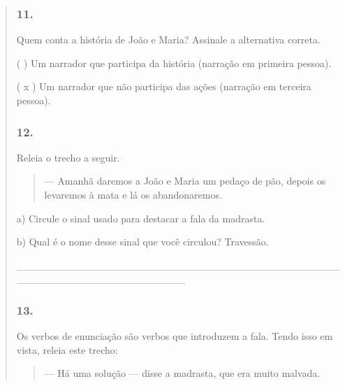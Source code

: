 \begin{quote}
\subsubsection{11. }\label{section-26}

Quem conta a história de João e Maria? Assinale a alternativa correta.


( ) Um narrador que participa da história (narração em primeira pessoa).

( x ) Um narrador que não participa das ações (narração em terceira
pessoa).

\subsubsection{12. }\label{section-27}

Releia o trecho a seguir.

\begin{quote}
--- Amanhã daremos a João e Maria um pedaço de pão, depois os
levaremos à mata e lá os abandonaremos.
\end{quote}

a) Circule o sinal usado para destacar a fala da madrasta.

b) Qual é o nome desse sinal que você circulou? Travessão.

\_\_\_\_\_\_\_\_\_\_\_\_\_\_\_\_\_\_\_\_\_\_\_\_\_\_\_\_\_\_\_\_\_\_\_\_\_\_\_\_\_\_\_\_\_\_\_\_\_\_\_\_\_\_\_\_\_\_\_\_\_\_\_\_\_\_\_

\subsubsection{13. }\label{section-28}

Os verbos de enunciação são verbos que introduzem a fala. Tendo isso em
vista, releia este trecho:

\begin{quote}
--- Há uma solução --- disse a madrasta, que era muito malvada.
\end{quote}



\end{quote}
